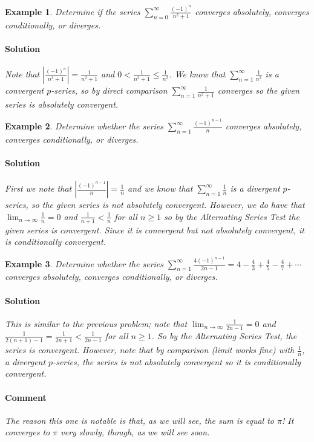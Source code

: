 \documentclass[letterpaper, 11pt, openany]{book}
\theoremstyle{mytheoremstyle}
\theoremstyle{myexamplestyle}
\newtheorem{example}{Example}[section]
\newenvironment{solution}{\paragraph{\sffamily \smaller \fontseries{b}\selectfont Solution}}{\hfill\faSquare}
\newenvironment{commentary}{\paragraph{\sffamily \smaller \fontseries{b}\selectfont Comment}}{}
\begin{document}
\begin{example}\label{e:altseriesrational}
    Determine if the series $\displaystyle \sum_{n = 0}^{\infty} \frac{(-1)^{n}}{n^{2} + 1}$ converges absolutely, converges conditionally, or diverges.
    \begin{solution}
        Note that $\displaystyle \left| \frac{(-1)^{n}}{n^{2} + 1} \right| = \frac{1}{n^{2} + 1}$ and $\displaystyle 0 < \frac{1}{n^{2} + 1} \leq \frac{1}{n^{2}}$. We know that $\displaystyle \sum_{n=1}^{\infty} \frac{1}{n^{2}}$ is a convergent $p$-series, so by direct comparison $\displaystyle \sum_{n=1}^{\infty} \frac{1}{n^{2} + 1}$ converges so the given series is absolutely convergent.
    \end{solution}
\end{example}

\begin{example}\label{e:altharmonicseries}
    Determine whether the series $\displaystyle \sum_{n=1}^{\infty} \frac{(-1)^{n-1}}{n}$ converges absolutely, converges conditionally, or diverges.
    \begin{solution}
        First we note that $\displaystyle \left| \frac{(-1)^{n-1}}{n} \right| = \frac{1}{n}$ and we know that $\displaystyle \sum_{n=1}^{\infty}\frac{1}{n}$ is a divergent $p$-series, so the given series is not absolutely convergent. However, we do have that $\displaystyle \lim_{n \to \infty} \frac{1}{n} = 0$ and $\displaystyle \frac{1}{n+1} < \frac{1}{n}$ for all $n \geq 1$ so by the Alternating Series Test the given series is convergent. Since it is convergent but not absolutely convergent, it is conditionally convergent.
    \end{solution}
\end{example}

\begin{example}\label{e:Liebnizpiseries}
    Determine whether the series $\displaystyle \sum_{n=1}^{\infty} \frac{4(-1)^{n-1}}{2n -1} = 4 - \frac{4}{3} + \frac{4}{5} - \frac{4}{7} + \cdots$ converges absolutely, converges conditionally, or diverges.
    \begin{solution}
        This is similar to the previous problem; note that $\displaystyle \lim_{n \to \infty} \frac{1}{2n-1} = 0$ and $\displaystyle \frac{1}{2(n+1) - 1} = \frac{1}{2n+1} < \frac{1}{2n-1}$ for all $n \geq 1$. So by the Alternating Series Test, the series is convergent. However, note that by comparison (limit works fine) with $\frac{1}{n}$, a divergent $p$-series, the series is not absolutely convergent so it is conditionally convergent.
    \end{solution}    
    \begin{commentary}
        The reason this one is notable is that, as we will see, the sum is equal to $\pi$! It converges to $\pi$ very slowly, though, as we will see soon.
    \end{commentary}
\end{example}
\end{document}
